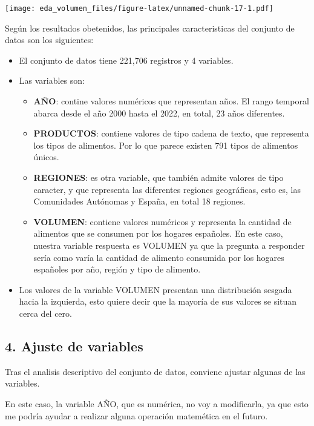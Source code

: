 \documentclass[
]{article}
\begin{document}
\texttt{[image: eda\_volumen\_files/figure-latex/unnamed-chunk-17-1.pdf]}

Según los resultados obetenidos, las principales caracteristicas del
conjunto de datos son los siguientes:

\begin{itemize}
\item
  El conjunto de datos tiene 221,706 registros y 4 variables.
\item
  Las variables son:

  \begin{itemize}
  \item
    \textbf{AÑO}: contine valores numéricos que representan años. El
    rango temporal abarca desde el año 2000 hasta el 2022, en total, 23
    años diferentes.
  \item
    \textbf{PRODUCTOS}: contiene valores de tipo cadena de texto, que
    representa los tipos de alimentos. Por lo que parece existen 791
    tipos de alimentos únicos.
  \item
    \textbf{REGIONES}: es otra variable, que también admite valores de
    tipo caracter, y que representa las diferentes regiones geográficas,
    esto es, las Comunidades Autónomas y España, en total 18 regiones.
  \item
    \textbf{VOLUMEN}: contiene valores numéricos y representa la
    cantidad de alimentos que se consumen por los hogares españoles. En
    este caso, nuestra variable respuesta es VOLUMEN ya que la pregunta
    a responder sería como varía la cantidad de alimento consumida por
    los hogares españoles por año, región y tipo de alimento.
  \end{itemize}
\item
  Los valores de la variable VOLUMEN presentan una distribución sesgada
  hacia la izquierda, esto quiere decir que la mayoría de sus valores se
  situan cerca del cero.
\end{itemize}

\hypertarget{ajuste-de-variables}{%
\subsection{4. Ajuste de variables}\label{ajuste-de-variables}}

Tras el analisis descriptivo del conjunto de datos, conviene ajustar
algunas de las variables.

En este caso, la variable AÑO, que es numérica, no voy a modificarla, ya
que esto me podría ayudar a realizar alguna operación matemética en el
futuro.
\end{document}
